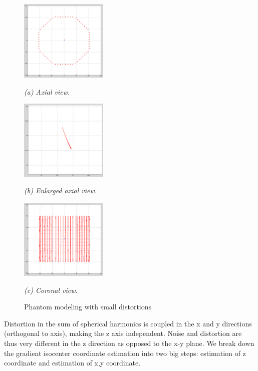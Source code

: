 \begin{figure}[htb]

  \begin{minipage}[b]{1.65in}
    \centering
    \centerline{\mbox{\includegraphics[width=1.65in]{isocenter/images/simulation/axial_distortion_1.eps}}}
    \centerline{\emph{(a) Axial view.}}
  \end{minipage}
  \hfill
  \begin{minipage}[b]{1.65in}
    \centering
    \centerline{\mbox{\includegraphics[width=1.65in]{isocenter/images/simulation/axial_tube_distortion_1.eps}}}
    \centerline{\emph{(b) Enlarged axial view.}}
  \end{minipage}
  \hfill
  \begin{minipage}[b]{1.65in}
    \centering
    \centerline{\mbox{\includegraphics[width=1.65in]{isocenter/images/simulation/coronal_distortion_1.eps}}}
    \centerline{\emph{(c) Coronal view.}}
  \end{minipage}
%
  \caption{Phantom modeling with small distortions}
  \label{fig:3}
%
\end{figure}



Distortion in the sum of spherical harmonics is coupled in the x and y directions (orthogonal to axis), making the z axis independent.  Noise and distortion are thus very different in the z direction as opposed to the x-y plane.  We break down the gradient isocenter coordinate estimation into two big steps: estimation of z coordinate and estimation of x,y coordinate.

